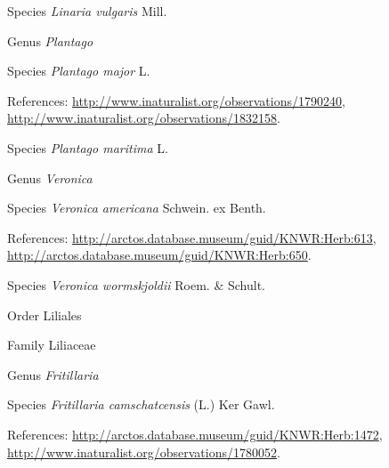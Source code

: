 \documentclass[9pt, article]{memoir}
\begin{document}
\begin{multicols}{2}
\vspace{6pt}\noindent\hspace{36pt}Species \textit{Linaria vulgaris} Mill.


\vspace{6pt}\noindent\hspace{30pt}Genus \textit{Plantago}


\vspace{6pt}\noindent\hspace{36pt}Species \textit{Plantago major} L.


\vspace{6pt}References: 
\url{http://www.inaturalist.org/observations/1790240}, 
\url{http://www.inaturalist.org/observations/1832158}.

\vspace{6pt}\noindent\hspace{36pt}Species \textit{Plantago maritima} L.


\vspace{6pt}\noindent\hspace{30pt}Genus \textit{Veronica}


\vspace{6pt}\noindent\hspace{36pt}Species \textit{Veronica americana} Schwein. ex Benth.


\vspace{6pt}References: 
\url{http://arctos.database.museum/guid/KNWR:Herb:613}, 
\url{http://arctos.database.museum/guid/KNWR:Herb:650}.

\vspace{6pt}\noindent\hspace{36pt}Species \textit{Veronica wormskjoldii} Roem. \& Schult.


\vspace{6pt}\noindent\hspace{18pt}Order Liliales


\vspace{6pt}\noindent\hspace{24pt}Family Liliaceae


\vspace{6pt}\noindent\hspace{30pt}Genus \textit{Fritillaria}


\vspace{6pt}\noindent\hspace{36pt}Species \textit{Fritillaria camschatcensis} (L.) Ker Gawl.


\vspace{6pt}References: 
\url{http://arctos.database.museum/guid/KNWR:Herb:1472}, 
\url{http://www.inaturalist.org/observations/1780052}.


\end{multicols}
\end{document}

